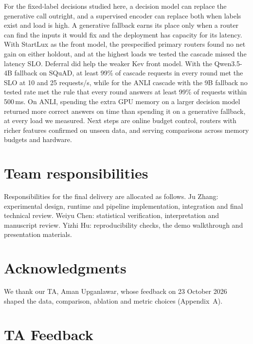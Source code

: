 \documentclass[11pt]{article}
\begin{document}
For the fixed-label decisions studied here, a decision model can replace the generative call outright, and a supervised encoder can replace both when labels exist and load is high. A generative fallback earns its place only when a router can find the inputs it would fix and the deployment has capacity for its latency. With StartLux as the front model, the prespecified primary routers found no net gain on either holdout, and at the highest loads we tested the cascade missed the latency SLO. Deferral did help the weaker Kev front model. With the Qwen3.5-4B fallback on SQuAD, at least 99\% of cascade requests in every round met the SLO at 10 and 25 requests/s, while for the ANLI cascade with the 9B fallback no tested rate met the rule that every round answers at least 99\% of requests within 500\,ms. On ANLI, spending the extra GPU memory on a larger decision model returned more correct answers on time than spending it on a generative fallback, at every load we measured. Next steps are online budget control, routers with richer features confirmed on unseen data, and serving comparisons across memory budgets and hardware.

\section*{Team responsibilities}
Responsibilities for the final delivery are allocated as follows. Ju Zhang: experimental design, runtime and pipeline implementation, integration and final technical review. Weiyu Chen: statistical verification, interpretation and manuscript review. Yizhi Hu: reproducibility checks, the demo walkthrough and presentation materials.

\section*{Acknowledgments}
We thank our TA, Aman Upganlawar, whose feedback on 23 October 2026 shaped the data, comparison, ablation and metric choices (Appendix~A).



\appendix

\section{TA Feedback}
\label{app:ta}
\end{document}
